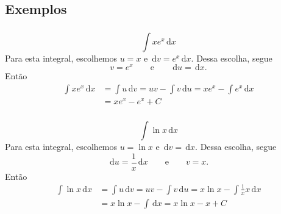\documentclass[10 pt]{beamer}
\newcommand{\makesubsection}[1]{\subsection[#1]{#1}}
\newcommand{\dif}{\,\mathrm{d}}
\newcommand{\myframe}[1]{
\begin{frame}
 \frametitle{\insertsection \qquad {\small \insertsubsection}}
#1
\end{frame}}
\begin{document}
\makesubsection{Exemplos}

\myframe{
  $$ \int\!xe^x\dif x $$
  Para esta integral, escolhemos
  $ u = x $ e $\dif v = e^x\dif x$. Dessa escolha,
  segue 
  $$ v = e^x \qquad \mbox{e} \qquad \dif u = \dif x. $$
  Então
  \begin{align*}
  \int\!xe^x\dif x & = \int\!u\dif v =
    uv - \int\!v\dif u = xe^x - \int\!e^x\dif x  \\
  & = xe^x - e^x + C
  \end{align*}
}

\myframe{
  $$ \int\!\ln x\dif x $$
  Para esta integral, escolhemos
  $ u = \ln x$ e $\dif v = \dif x$. Dessa escolha,
  segue
  $$ \dif u = \frac{1}{x}\dif x \qquad
    \mbox{e} \qquad v = x. $$
  Então
  \begin{align*}
    \int\!\ln x\dif x & = \int\!u\dif v =
      uv - \int\!v\dif u = x\ln x - \int\!\frac{1}{x}x\dif x \\
    & = x\ln x - \int\!\dif x = x\ln x - x + C
  \end{align*}
}
\end{document}
